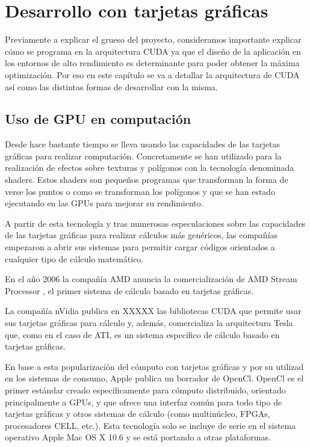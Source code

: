 \chapter{Desarrollo con tarjetas gráficas}

Previamente a explicar el grueso del proyecto, consideramos importante explicar cómo se programa en la arquitectura CUDA ya que el diseño de la aplicación en los entornos de alto rendimiento es determinante para poder obtener la máxima optimización. Por eso en este capítulo se va a detallar la arquitectura de CUDA así como las distintas formas de desarrollar con la misma.

\section{Uso de GPU en computación}

Desde hace bastante tiempo se lleva usando las capacidades de las tarjetas gráficas para realizar computación. Concretamente se han utilizado para la realización de efectos sobre texturas y polígonos con la tecnología denominada shaders. Estos shaders son pequeños programas que transforman la forma de verse los puntos o como se transforman los polígonos y que se han estado ejecutando en las GPUs para mejorar su rendimiento.

A partir de esta tecnología y tras numerosas especulaciones sobre las capacidades de las tarjetas gráficas para realizar cálculos más genéricos, las compañías empezaron a abrir sus sistemas para permitir cargar códigos orientados a cualquier tipo de cálculo matemático.

En el año 2006 la compañía AMD anuncia la comercialización de AMD Stream Processor \cite{website:kript_amd_stream}, el primer sistema de cálculo basado en tarjetas gráficas.

La compañía nVidia publica en XXXXX las bibliotecas CUDA que permite usar sus tarjetas gráficas para cálculo y, además, comercializa la arquitectura Tesla que, como en el caso de ATI, es un sistema específico de cálculo basado en tarjetas gráficas.

En base a esta popularización del cómputo con tarjetas gráficas y por  su utilizad en los sistemas  de consumo, Apple publica un borrador de OpenCl. OpenCl es  el primer estándar creado específicamente para cómputo distribuido, orientado principalmente a GPUs, y que ofrece una interfaz común para todo tipo de tarjetas gráficas y otros sistemas de cálculo (como multinúcleo, FPGAs, procesadores CELL, etc.). Esta tecnología solo se incluye de serie en el sistema operativo Apple Mac OS X 10.6 y se está portando a otras plataformas.

